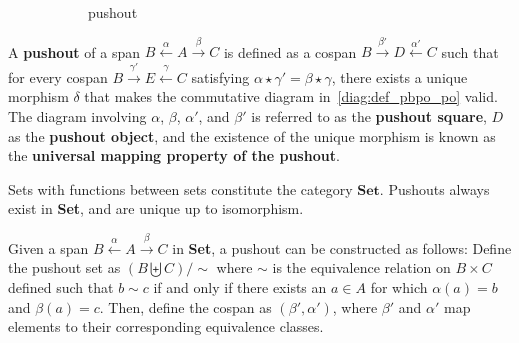 \begin{definition}
    \begin{figure}[htbp] 
        \center
        \begin{subfigure}[b]{0.38 \textwidth}
            \center
            \caption{pushout}
            \label{diag:def_pbpo_po}
        \end{subfigure}
        \caption{}
        \label{fig:def_pb_po}
    \end{figure}
    A \textbf{pushout} of a span \( B \overset{\alpha}{\leftarrow} A \overset{\beta}{\rightarrow} C \) is defined as a cospan \( B \overset{\beta'}{\rightarrow} D \overset{\alpha'}{\leftarrow} C \) such that for every cospan \( B \overset{\gamma'}{\rightarrow} E \overset{\gamma}{\leftarrow} C \) satisfying \(\alpha \star \gamma' = \beta \star \gamma\), there exists a unique morphism \(\delta\) that makes the commutative diagram in~\autoref{diag:def_pbpo_po} valid. The diagram involving \(\alpha\), \(\beta\), \(\alpha'\), and \(\beta'\) is referred to as the \textbf{pushout square}, \(D\) as the \textbf{pushout object}, and the existence of the unique morphism is known as the \textbf{universal mapping property of the pushout}.
\end{definition}

Sets with functions between sets constitute the category \(\mathbf{Set}\). Pushouts always exist in \textbf{Set}, and are unique up to isomorphism.

\begin{example}
    Given a span \( B \overset{\alpha}{\leftarrow} A \overset{\beta}{\rightarrow} C \) in \textbf{Set}, a pushout can be constructed as follows:
    Define the pushout set as
    \(
     (B \biguplus C) / \sim
    \)
    where \(\sim\) is the equivalence relation on \(B \times C\) defined such that \( b \sim c \) if and only if there exists an \(a \in A\) for which \(\alpha(a) = b\) and \(\beta(a) = c\). Then, define the cospan as \( (\beta',\alpha') \), where \(\beta'\) and \(\alpha'\) map elements to their corresponding equivalence classes.
\end{example}